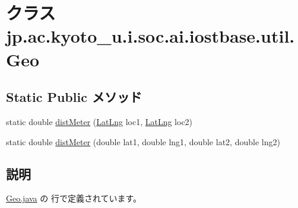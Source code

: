 \hypertarget{classjp_1_1ac_1_1kyoto__u_1_1i_1_1soc_1_1ai_1_1iostbase_1_1util_1_1_geo}{\section{クラス jp.\-ac.\-kyoto\-\_\-u.\-i.\-soc.\-ai.\-iostbase.\-util.\-Geo}
\label{classjp_1_1ac_1_1kyoto__u_1_1i_1_1soc_1_1ai_1_1iostbase_1_1util_1_1_geo}
}
\subsection*{Static Public メソッド}
\begin{DoxyCompactItemize}
\item 
static double \hyperlink{classjp_1_1ac_1_1kyoto__u_1_1i_1_1soc_1_1ai_1_1iostbase_1_1util_1_1_geo_a4cfe7175a4a4cfcbe5ec79246fa7c876}{dist\-Meter} (\hyperlink{classjp_1_1ac_1_1kyoto__u_1_1i_1_1soc_1_1ai_1_1iostbase_1_1service_1_1intf_1_1_lat_lng}{Lat\-Lng} loc1, \hyperlink{classjp_1_1ac_1_1kyoto__u_1_1i_1_1soc_1_1ai_1_1iostbase_1_1service_1_1intf_1_1_lat_lng}{Lat\-Lng} loc2)
\item 
static double \hyperlink{classjp_1_1ac_1_1kyoto__u_1_1i_1_1soc_1_1ai_1_1iostbase_1_1util_1_1_geo_a38dc9a1019018864fbf9cadea5b3e50f}{dist\-Meter} (double lat1, double lng1, double lat2, double lng2)
\end{DoxyCompactItemize}


\subsection{説明}


 \hyperlink{_geo_8java_source}{Geo.\-java} の  行で定義されています。



